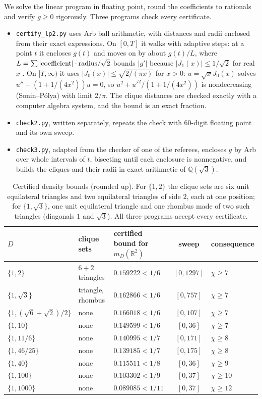\documentclass[11pt,a4paper]{amsart}
\theoremstyle{definition}
\theoremstyle{remark}
\newcommand{\Q}{\mathbb{Q}}
\newcommand{\R}{\mathbb{R}}
\begin{document}
We solve the linear program in floating point, round the coefficients to rationals and verify $g\ge0$ rigorously.
Three programs check every certificate.
\begin{itemize}
\item \texttt{certify\_lp2.py} uses Arb ball arithmetic, with distances and radii enclosed from their exact
expressions. On $[0,T]$ it walks with adaptive steps: at a point $t$ it encloses $g(t)$ and moves on by about
$g(t)/L$, where $L=\sum|{\rm coefficient}|\cdot{\rm radius}/\sqrt2$ bounds $|g'|$ because $|J_1(x)|\le1/\sqrt2$ for
real $x$ \cite[10.14.1]{DLMF}. On $[T,\infty)$ it uses $|J_0(x)|\le\sqrt{2/(\pi x)}$ for $x>0$: $u=\sqrt xJ_0(x)$
solves $u''+(1+1/(4x^2))u=0$, so $u^2+u'^2/(1+1/(4x^2))$ is nondecreasing (Sonin--P\'olya) with limit $2/\pi$. The
clique distances are checked exactly with a computer algebra system, and the bound is an exact fraction.
\item \texttt{check2.py}, written separately, repeats the check with $60$-digit floating point and its own sweep.
\item \texttt{check3.py}, adapted from the checker of one of the referees, encloses $g$ by Arb over whole intervals
of $t$, bisecting until each enclosure is nonnegative, and builds the cliques and their radii in exact arithmetic of
$\Q(\sqrt3)$.
\end{itemize}

\begin{table}[ht]
\centering
\begin{tabular}{lllcl}
\toprule
$D$ & clique sets & certified bound for $m_D(\R^2)$ & sweep & consequence\\
\midrule
$\{1,2\}$ & $6+2$ triangles & $0.159222<1/6$ & $[0,1297]$ & $\chi\ge7$\\
$\{1,\sqrt3\}$ & triangle, rhombus & $0.162866<1/6$ & $[0,757]$ & $\chi\ge7$\\
$\{1,(\sqrt6+\sqrt2)/2\}$ & none & $0.166018<1/6$ & $[0,107]$ & $\chi\ge7$\\
$\{1,10\}$ & none & $0.149599<1/6$ & $[0,36]$ & $\chi\ge7$\\
$\{1,11/6\}$ & none & $0.140995<1/7$ & $[0,171]$ & $\chi\ge8$\\
$\{1,46/25\}$ & none & $0.139185<1/7$ & $[0,175]$ & $\chi\ge8$\\
$\{1,40\}$ & none & $0.115511<1/8$ & $[0,36]$ & $\chi\ge9$\\
$\{1,100\}$ & none & $0.103302<1/9$ & $[0,37]$ & $\chi\ge10$\\
$\{1,1000\}$ & none & $0.089085<1/11$ & $[0,37]$ & $\chi\ge12$\\
\bottomrule
\end{tabular}
\caption{Certified density bounds (rounded up). For $\{1,2\}$ the clique sets are six unit equilateral triangles and
two equilateral triangles of side $2$, each at one position; for $\{1,\sqrt3\}$, one unit equilateral triangle and one
rhombus made of two such triangles (diagonals $1$ and $\sqrt3$). All three programs accept every certificate.}
\label{tab:lp}
\end{table}
\end{document}
